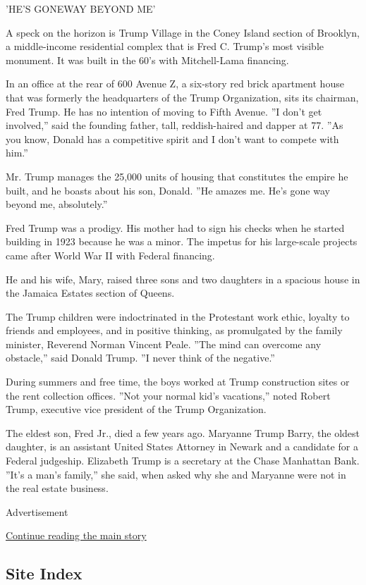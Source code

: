 'HE'S GONEWAY BEYOND ME'

A speck on the horizon is Trump Village in the Coney Island section of
Brooklyn, a middle-income residential complex that is Fred C. Trump's
most visible monument. It was built in the 60's with Mitchell-Lama
financing.

In an office at the rear of 600 Avenue Z, a six-story red brick
apartment house that was formerly the headquarters of the Trump
Organization, sits its chairman, Fred Trump. He has no intention of
moving to Fifth Avenue. ''I don't get involved,'' said the founding
father, tall, reddish-haired and dapper at 77. ''As you know, Donald has
a competitive spirit and I don't want to compete with him.''

Mr. Trump manages the 25,000 units of housing that constitutes the
empire he built, and he boasts about his son, Donald. ''He amazes me.
He's gone way beyond me, absolutely.''

Fred Trump was a prodigy. His mother had to sign his checks when he
started building in 1923 because he was a minor. The impetus for his
large-scale projects came after World War II with Federal financing.

He and his wife, Mary, raised three sons and two daughters in a spacious
house in the Jamaica Estates section of Queens.

The Trump children were indoctrinated in the Protestant work ethic,
loyalty to friends and employees, and in positive thinking, as
promulgated by the family minister, Reverend Norman Vincent Peale. ''The
mind can overcome any obstacle,'' said Donald Trump. ''I never think of
the negative.''

During summers and free time, the boys worked at Trump construction
sites or the rent collection offices. ''Not your normal kid's
vacations,'' noted Robert Trump, executive vice president of the Trump
Organization.

The eldest son, Fred Jr., died a few years ago. Maryanne Trump Barry,
the oldest daughter, is an assistant United States Attorney in Newark
and a candidate for a Federal judgeship. Elizabeth Trump is a secretary
at the Chase Manhattan Bank. ''It's a man's family,'' she said, when
asked why she and Maryanne were not in the real estate business.

Advertisement

\protect\hyperlink{after-bottom}{Continue reading the main story}

\hypertarget{site-index}{%
\subsection{Site Index}\label{site-index}}

